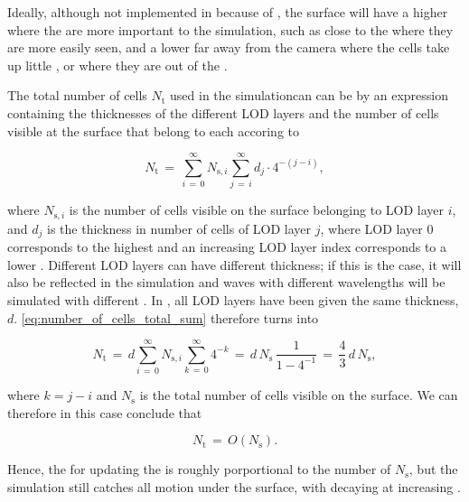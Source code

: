 Ideally, although not implemented in \thisprojectwork because of \itslimitedtime, the surface will have a higher \LOD where the  are more important to the simulation, such as close to the \camera where they are more easily seen, and a lower \LOD far away from the camera where the cells take up little , or where they are out of the \FOV.

The total number of cells $N_{\text{t}}$ used in the simulationcan can be \approximated by an expression containing the thicknesses of the different LOD layers and the number of cells visible at the surface that belong to each \LOD accoring to

\begin{equation} \label{eq:number_of_cells_total_sum}
N_{\text{t}} \,=\, \sum_{i\,=\,0}^\infty N_{\text{s},i}\sum_{j\,=\,i}^\infty d_j\cdot 4^{-(j-i)},
\end{equation}

where $N_{\text{s},i}$ is the number of cells visible on the surface belonging to LOD layer $i$, and $d_j$ is the thickness in number of cells of LOD layer $j$, where LOD layer $0$ corresponds to the highest \LOD and an increasing LOD layer index corresponds to a lower \LOD. Different LOD layers can have different thickness; if this is the case, it will also be reflected in the simulation and waves with different wavelengths will be simulated with different \accuracy. In \thisprojectwork, all LOD layers have been given the same thickness, $d$. \eqref{eq:number_of_cells_total_sum} therefore turns into

\begin{equation} \label{eq:number_of_cells_total}
N_{\text{t}} \,=\, d\sum_{i\,=\,0}^\infty N_{\text{s},i}\sum_{k\,=\,0}^\infty 4^{-k} \,=\, d\,N_{\text{s}}\,\frac{1}{1-4^{-1}} \,=\, \frac{4}{3}\,d\,N_{\text{s}},
\end{equation}

where $k = j-i$ and $N_{\text{s}}$ is the total number of cells visible on the surface. We can therefore in this case conclude that

\begin{equation} \label{eq:number_of_cells_total_ordo}
N_{\text{t}} \,=\, O(N_{\text{s}}).
\end{equation}

Hence, the  for updating the  is roughly porportional to the number of  $N_{\text{s}}$, but the simulation still catches all motion under the surface, with decaying \accuracy at increasing .

